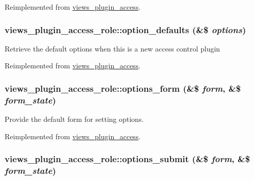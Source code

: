 Reimplemented from \hyperlink{classviews__plugin__access_d4038a32fccc6a662a74f437d0bf6a23}{views\_\-plugin\_\-access}.\hypertarget{classviews__plugin__access__role_337043de2f34f2e861058d3584286499}{
\subsubsection[{option\_\-defaults}]{\setlength{\rightskip}{0pt plus 5cm}views\_\-plugin\_\-access\_\-role::option\_\-defaults (\&\$ {\em options})}}
\label{classviews__plugin__access__role_337043de2f34f2e861058d3584286499}


Retrieve the default options when this is a new access control plugin 

Reimplemented from \hyperlink{classviews__plugin__access_6e5248925c3c3a8059e0a7121bc6777b}{views\_\-plugin\_\-access}.\hypertarget{classviews__plugin__access__role_76293d33e84a78e2ce0df6df955da760}{
\subsubsection[{options\_\-form}]{\setlength{\rightskip}{0pt plus 5cm}views\_\-plugin\_\-access\_\-role::options\_\-form (\&\$ {\em form}, \/  \&\$ {\em form\_\-state})}}
\label{classviews__plugin__access__role_76293d33e84a78e2ce0df6df955da760}


Provide the default form for setting options. 

Reimplemented from \hyperlink{classviews__plugin__access_530865442ea42db5e720e6c49f3d16f2}{views\_\-plugin\_\-access}.\hypertarget{classviews__plugin__access__role_d9bf6eddd91a7c224fb813a58077ee4d}{
\subsubsection[{options\_\-submit}]{\setlength{\rightskip}{0pt plus 5cm}views\_\-plugin\_\-access\_\-role::options\_\-submit (\&\$ {\em form}, \/  \&\$ {\em form\_\-state})}}
\label{classviews__plugin__access__role_d9bf6eddd91a7c224fb813a58077ee4d}


